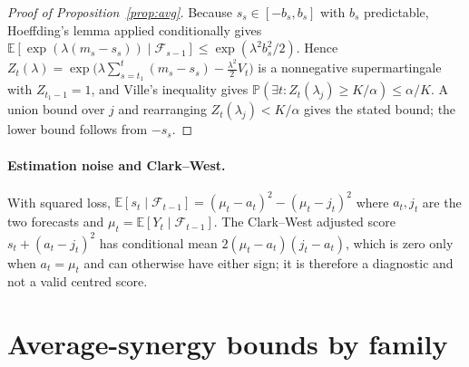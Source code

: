 \documentclass[pdflatex,sn-mathphys-ay]{sn-jnl}%
\theoremstyle{thmstyleone}%
\theoremstyle{thmstyletwo}%
\theoremstyle{thmstylethree}%
\newcommand{\E}{\mathbb{E}}
\newcommand{\Prob}{\mathbb{P}}
\newcommand{\F}{\mathcal{F}}
\begin{document}
\begin{appendices}
\begin{proof}[Proof of Proposition~\ref{prop:avg}]
Because $s_s\in[-b_s,b_s]$ with $b_s$ predictable, Hoeffding's lemma applied conditionally gives
$\E[\exp(\lambda(m_s-s_s))\mid\F_{s-1}]\le\exp(\lambda^2b_s^2/2)$. Hence
$Z_t(\lambda)=\exp\bigl(\lambda\sum_{s=t_1}^t(m_s-s_s)-\tfrac{\lambda^2}2V_t\bigr)$ is a nonnegative supermartingale with $Z_{t_1-1}=1$, and
Ville's inequality gives $\Prob(\exists t:Z_t(\lambda_j)\ge K/\alpha)\le\alpha/K$. A union bound over $j$ and rearranging $Z_t(\lambda_j)<K/\alpha$ gives the stated bound; the lower bound follows from $-s_s$.
\end{proof}

\paragraph{Estimation noise and Clark--West.} With squared loss, $\E[s_t\mid\F_{t-1}]=(\mu_t-a_t)^2-(\mu_t-j_t)^2$ where
$a_t,j_t$ are the two forecasts and $\mu_t=\E[Y_t\mid\F_{t-1}]$. The Clark--West adjusted score $s_t+(a_t-j_t)^2$ has conditional mean $2(\mu_t-a_t)(j_t-a_t)$, which is zero only
when $a_t=\mu_t$ and can otherwise have either sign; it is therefore a diagnostic and not a valid centred score.


\section{Average-synergy bounds by family}\label{secA:bounds}


\end{appendices}
\end{document}
